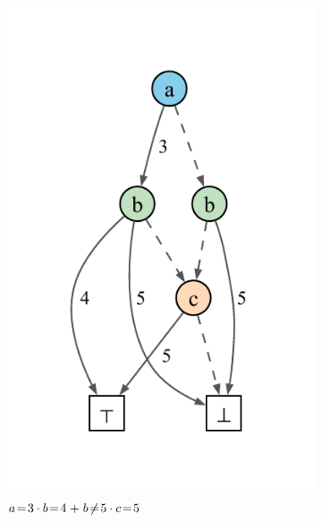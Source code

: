 \documentclass[acmsmall,dvipsnames,nonacm]{acmart}
\begin{document}

\begin{figure}
    \centering
    \begin{subfigure}[b]{0.29\textwidth}
        \centering
        \includegraphics[scale=0.5]{viz/sp1.pdf}
        \caption{$a\test3 \cdot b\test4 \mathrel{+} b \testNE 5 \cdot c\test5$}
        \label{fig:sp1}
    \end{subfigure}
    \hfill %
    \begin{subfigure}[b]{0.29\textwidth}
        \centering

\end{subfigure}
\end{figure}
\end{document}
